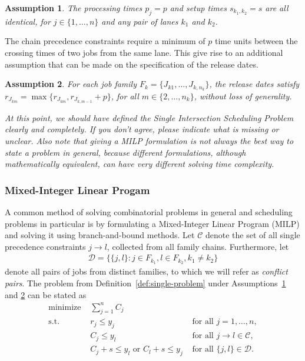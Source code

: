 \documentclass{article}
\theoremstyle{definition}
\theoremstyle{plain}
\newtheorem{assump}{Assumption}[section]
\begin{document}
\begin{assump}
  \label{assump1}
  The processing times $p_{j} = p$ and setup times $s_{k_{1},k_{2}} = s$ are all
  identical, for $j \in \{1, \dots, n\}$ and any pair of lanes $k_{1}$ and
  $k_{2}$.
\end{assump}

The chain precedence constraints require a minimum of $p$ time units between the
crossing times of two jobs from the same lane. This give rise to an additional
assumption that can be made on the specification of the release dates.

\begin{assump}
  \label{assump2}
  For each job family $F_{k} = \{ J_{k1} , \dots, J_{k,n_{k}} \}$, the release
  dates satisfy $r_{J_{km}} = \max\{ r_{J_{km}}, r_{J_{k,m-1}} + p \}$, for all
  $m \in \{2, \dots, n_{k}\}$, without loss of generality.
\end{assump}

\textit{\color{blue}At this point, we should have defined the Single Intersection Scheduling Problem clearly and completely. If you don't agree, please indicate what is missing or unclear. Also note that giving a MILP formulation is not always the best way to state a problem in general, because different formulations, although mathematically equivalent, can have very different solving time complexity.}


\subsubsection{Mixed-Integer Linear Progam}
\label{sec:single-MILP}

A common method of solving combinatorial problems in general and scheduling
problems in particular is by formulating a Mixed-Integer Linear Program (MILP)
and solving it using branch-and-bound methods. Let $\mathcal{C}$ denote the set
of all single precedence constraints $j \rightarrow l$, collected from all
family chains. Furthermore, let
\begin{align}
  \mathcal{D} = \{ \{j,l\} : j \in F_{k_{1}}, l \in F_{k_{2}}, k_{1} \neq k_{2} \}
\end{align}
denote all pairs of jobs from distinct families, to which we will refer as
\textit{conflict pairs}. The problem from Definition~\ref{def:single-problem}
under Assumptions~\ref{assump1} and \ref{assump2} can be stated as
%
\begin{subequations}
\begin{align}
  \text{minimize } & \sum_{j=1}^{n} C_{j} & \\
  \text{s.t. } & r_{j} \leq y_{j} & \text{ for all } j=1, \dots, n, \\
              & C_{j} \leq y_{l} & \text{ for all } j \rightarrow l \in \mathcal{C}, \\
              & C_{j} + s \leq y_{l} \text{ or } C_{l} + s \leq y_{j} & \text{ for all } \{j,l\} \in \mathcal{D}. \label{eq:natural-disjunctions}
\end{align}
\end{subequations}
\end{document}
